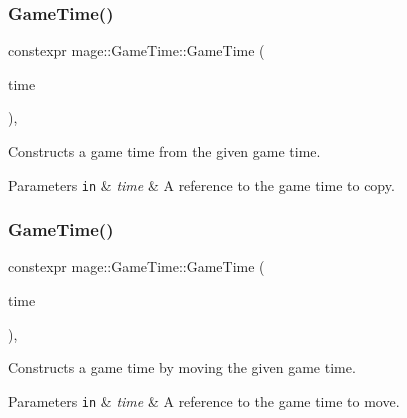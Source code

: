 \subsubsection{\texorpdfstring{Game\+Time()}{GameTime()}\hspace{0.1cm}{\footnotesize\ttfamily [3/4]}}
{\footnotesize\ttfamily constexpr mage\+::\+Game\+Time\+::\+Game\+Time (\begin{DoxyParamCaption}\item[{const \hyperlink{classmage_1_1_game_time}{Game\+Time} \&}]{time }\end{DoxyParamCaption})\hspace{0.3cm}{\ttfamily [default]}, {\ttfamily [noexcept]}}

Constructs a game time from the given game time.


\begin{DoxyParams}[1]{Parameters}
\mbox{\tt in}  & {\em time} & A reference to the game time to copy. \\
\hline
\end{DoxyParams}
\hypertarget{classmage_1_1_game_time_a87dd026fe0c83aee86c39e4c40e641fb}{}\label{classmage_1_1_game_time_a87dd026fe0c83aee86c39e4c40e641fb} 
\subsubsection{\texorpdfstring{Game\+Time()}{GameTime()}\hspace{0.1cm}{\footnotesize\ttfamily [4/4]}}
{\footnotesize\ttfamily constexpr mage\+::\+Game\+Time\+::\+Game\+Time (\begin{DoxyParamCaption}\item[{\hyperlink{classmage_1_1_game_time}{Game\+Time} \&\&}]{time }\end{DoxyParamCaption})\hspace{0.3cm}{\ttfamily [default]}, {\ttfamily [noexcept]}}

Constructs a game time by moving the given game time.


\begin{DoxyParams}[1]{Parameters}
\mbox{\tt in}  & {\em time} & A reference to the game time to move. \\
\hline
\end{DoxyParams}
\hypertarget{classmage_1_1_game_time_ae7a709bde27a737be9ebed2a92e00c8b}{}\label{classmage_1_1_game_time_ae7a709bde27a737be9ebed2a92e00c8b} 
